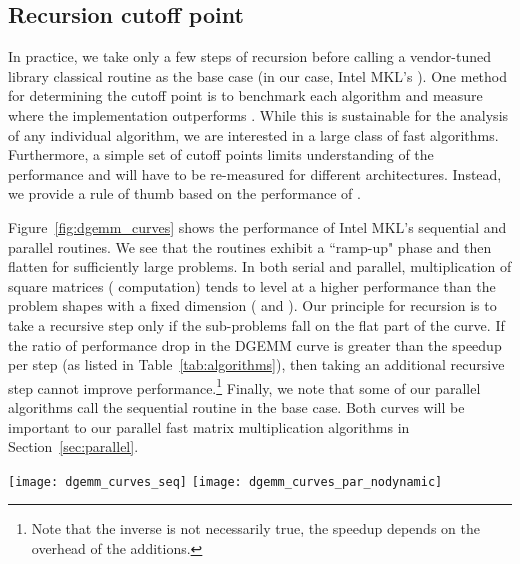 \documentclass[preprint]{sigplanconf}
\begin{document}
\subsection{Recursion cutoff point}
\label{sec:recursion_cutoff}

In practice, we take only a few steps of recursion before calling a vendor-tuned library classical routine as the base case (in our case, Intel MKL's ).
One method for determining the cutoff point is to benchmark each algorithm and measure where the implementation
outperforms .
While this is sustainable for the analysis of any individual algorithm, we are interested in a large class of fast algorithms.
Furthermore, a simple set of cutoff points limits understanding of the performance and will have to be re-measured for different architectures.
Instead, we provide a rule of thumb based on the performance of .

Figure~\ref{fig:dgemm_curves} shows the performance of Intel MKL's sequential and parallel  routines.
We see that the routines exhibit a ``ramp-up" phase and then flatten for sufficiently large problems.
In both serial and parallel, multiplication of square matrices ( computation) tends to level at a higher performance than
the problem shapes with a fixed dimension ( and ).
Our principle for recursion is to take a recursive step only if the sub-problems fall on the flat part of the curve.
If the ratio of performance drop in the DGEMM curve is greater than the speedup per step (as listed in Table~\ref{tab:algorithms}),
then taking an additional recursive step cannot improve performance.\footnote{Note that the inverse is not necessarily true, the speedup depends on the overhead of the additions.}
Finally, we note that some of our parallel algorithms call the sequential  routine in the base case.
Both curves will be important to our parallel fast matrix multiplication algorithms in Section~\ref{sec:parallel}.

\begin{figure*}[tb]
\centering
\texttt{[image: dgemm\_curves\_seq]} 
\texttt{[image: dgemm\_curves\_par\_nodynamic]}
\caption{
Performance curves of MKL's  routine in serial (left) and in parallel (right) for three different problem shapes.
The performance curves exhibit a ``ramp-up" phase and then flatten for large enough problems.
Performance levels near  in serial and  in parallel.
For large problems in both serial and parallel,  multiplication is faster than , which is faster than .
We note that sequential performance is faster than parallel performance due to Intel Turbo Boost, which increases the clock speed from 2.4 to 3.2 GHz.
With Turbo Boost, peak sequential performance is 25.6 GFLOPS.
Peak parallel performance is 19.2 GFLOPS/core.
}
\label{fig:dgemm_curves}
\end{figure*}
\end{document}
